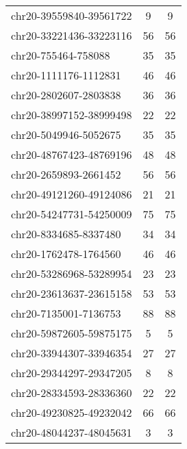 \begin{longtable}{lSS}
	chr20-39559840-39561722 & 9      & 9                                         \\
	chr20-33221436-33223116 & 56     & 56                                        \\
	chr20-755464-758088     & 35     & 35                                        \\
	chr20-1111176-1112831   & 46     & 46                                        \\
	chr20-2802607-2803838   & 36     & 36                                        \\
	chr20-38997152-38999498 & 22     & 22                                        \\
	chr20-5049946-5052675   & 35     & 35                                        \\
	chr20-48767423-48769196 & 48     & 48                                        \\
	chr20-2659893-2661452   & 56     & 56                                        \\
	chr20-49121260-49124086 & 21     & 21                                        \\
	chr20-54247731-54250009 & 75     & 75                                        \\
	chr20-8334685-8337480   & 34     & 34                                        \\
	chr20-1762478-1764560   & 46     & 46                                        \\
	chr20-53286968-53289954 & 23     & 23                                        \\
	chr20-23613637-23615158 & 53     & 53                                        \\
	chr20-7135001-7136753   & 88     & 88                                        \\
	chr20-59872605-59875175 & 5      & 5                                         \\
	chr20-33944307-33946354 & 27     & 27                                        \\
	chr20-29344297-29347205 & 8      & 8                                         \\
	chr20-28334593-28336360 & 22     & 22                                        \\
	chr20-49230825-49232042 & 66     & 66                                        \\
	chr20-48044237-48045631 & 3      & 3                                         \\

\end{longtable}
